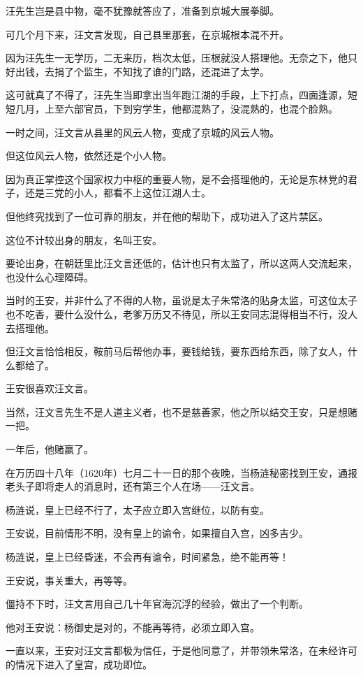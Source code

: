 \begin{multicols}{\theparacolNo}
汪先生岂是县中物，毫不犹豫就答应了，准备到京城大展拳脚。

可几个月下来，汪文言发现，自己县里那套，在京城根本混不开。

因为汪先生一无学历，二无来历，档次太低，压根就没人搭理他。无奈之下，他只好出钱，去捐了个监生，不知找了谁的门路，还混进了太学。

这可就真了不得了，汪先生当即拿出当年跑江湖的手段，上下打点，四面逢源，短短几月，上至六部官员，下到穷学生，他都混熟了，没混熟的，也混个脸熟。

一时之间，汪文言从县里的风云人物，变成了京城的风云人物。

但这位风云人物，依然还是个小人物。

因为真正掌控这个国家权力中枢的重要人物，是不会搭理他的，无论是东林党的君子，还是三党的小人，都看不上这位江湖人士。

但他终究找到了一位可靠的朋友，并在他的帮助下，成功进入了这片禁区。

这位不计较出身的朋友，名叫王安。

要论出身，在朝廷里比汪文言还低的，估计也只有太监了，所以这两人交流起来，也没什么心理障碍。

当时的王安，并非什么了不得的人物，虽说是太子朱常洛的贴身太监，可这位太子也不吃香，要什么没什么，老爹万历又不待见，所以王安同志混得相当不行，没人去搭理他。

但汪文言恰恰相反，鞍前马后帮他办事，要钱给钱，要东西给东西，除了女人，什么都给了。

王安很喜欢汪文言。

当然，汪文言先生不是人道主义者，也不是慈善家，他之所以结交王安，只是想赌一把。

一年后，他赌赢了。

在万历四十八年（1620年）七月二十一日的那个夜晚，当杨涟秘密找到王安，通报老头子即将走人的消息时，还有第三个人在场——汪文言。

杨涟说，皇上已经不行了，太子应立即入宫继位，以防有变。

王安说，目前情形不明，没有皇上的谕令，如果擅自入宫，凶多吉少。

杨涟说，皇上已经昏迷，不会再有谕令，时间紧急，绝不能再等！

王安说，事关重大，再等等。

僵持不下时，汪文言用自己几十年官海沉浮的经验，做出了一个判断。

他对王安说：杨御史是对的，不能再等待，必须立即入宫。

一直以来，王安对汪文言都极为信任，于是他同意了，并带领朱常洛，在未经许可的情况下进入了皇宫，成功即位。


\end{multicols}

